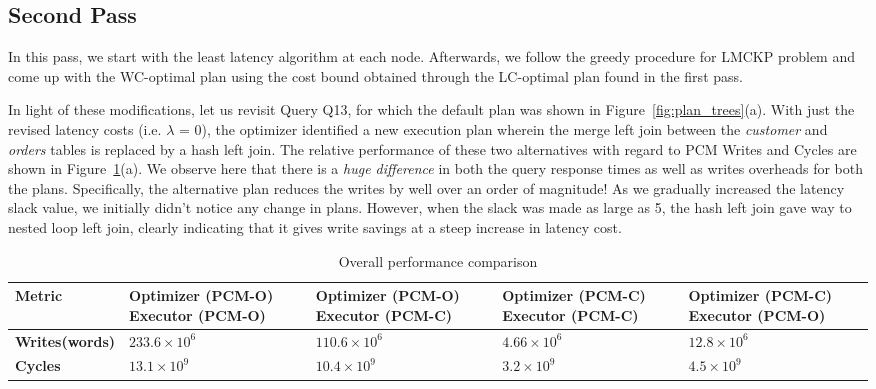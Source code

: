 \documentclass[10pt]{article}
\begin{document}
\subsection*{Second Pass} 
In this pass, we start with the least latency algorithm at each node. Afterwards, we follow the greedy procedure for LMCKP problem and come up with the WC-optimal plan using the cost bound obtained through the LC-optimal plan found in the first pass. 

In light of these modifications, let us revisit Query Q13, for which
the default plan was shown in Figure~\ref{fig:plan_trees}(a). With
just the revised latency costs (i.e. $\lambda$ = 0), the optimizer
identified a new execution plan wherein the merge left join between the
\textit{customer} and \textit{orders} tables is replaced by a hash left
join. The relative performance of these two alternatives with regard to
PCM Writes and Cycles are shown in Figure~\ref{fig:perf_comp}(a). We observe here that there is a \emph{huge difference}
in both the query response times as well as writes overheads for both
the plans.  Specifically, the alternative plan reduces the writes by
well over an order of magnitude!  As we gradually increased the latency
slack value, we initially didn't notice any change in plans. However,
when the slack was made as large as 5, the hash left join gave way to
nested loop left join, clearly indicating that it gives write savings
at a steep increase in latency cost.


%
%
\begin{table}[!h]
\centering
\caption{Overall performance comparison}
\label{fig:perf_comp}
\begin{tabular}{p{2.8cm}p{2.5cm}p{2.5cm}p{2.5cm}p{2.5cm}}
\toprule                                                                                                
\textbf{Metric} & \textbf{Optimizer (PCM-O) Executor (PCM-O) } & \textbf{Optimizer (PCM-O) Executor (PCM-C)} & \textbf{Optimizer (PCM-C) Executor (PCM-C)} & \textbf{Optimizer (PCM-C) Executor (PCM-O)}\\
\midrule                                                                                                

\textbf{Writes(words)} &  $233.6 \times 10^6$ & $110.6 \times 10^6$ & $4.66 \times 10^6$ & $12.8 \times 10^6$\\ 
  \textbf{Cycles} &  $13.1 \times 10^9$ & $10.4 \times 10^9$ & $3.2 \times 10^9$ & $4.5 \times 10^9$\\ 
  \bottomrule                                                                                             
\end{tabular}                                                                                           
\end{table}
\end{document}
